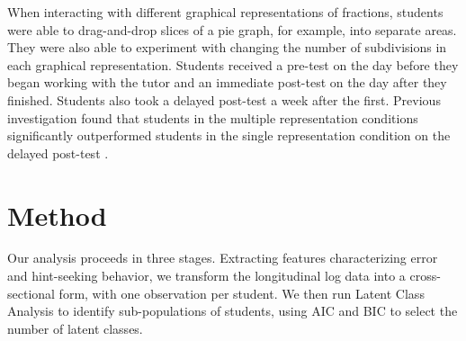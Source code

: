 \documentclass{edm_template}
\begin{document}
When interacting with different graphical representations of fractions, students were able to drag-and-drop slices of a pie graph, for example, into separate areas. They were also able to experiment with changing the number of subdivisions in each graphical representation. Students received a pre-test on the day before they began working with the tutor and an immediate post-test on the day after they finished. Students also took a delayed post-test a week after the first. Previous investigation found that students in the multiple representation conditions significantly outperformed students in the single representation condition on the delayed post-test \cite{Rau2012}. 


 
\section{Method}
\label{sec:method}

Our analysis proceeds in three stages. Extracting features characterizing error and hint-seeking behavior, we transform the longitudinal log data into a cross-sectional form, with one observation per student. We then run Latent Class Analysis to identify sub-populations of students, using AIC and BIC to select the number of latent classes. 
\end{document}
